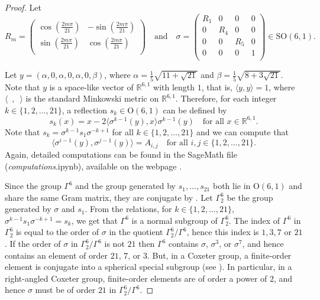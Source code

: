 \documentclass{amsart}
\theoremstyle{plain}
\theoremstyle{definition}
\theoremstyle{remark}
\numberwithin{equation}{section}
\newcommand{\rr}{\mathbb R}
\begin{document}
\begin{proof}

Let $$ R_m = \left(\begin{array}{rr}
\cos\left(\frac{2m\pi}{21}\right) & -\sin\left(\frac{2m\pi}{21}\right) \\
\sin\left(\frac{2m\pi}{21}\right) & \cos\left(\frac{2m\pi}{21}\right) \\
\end{array}\right)
\quad \textrm{and} \quad
\sigma = \left( \begin{array}{rrrr} 
R_1 & 0 & 0 & 0\\
0 & R_4 & 0 & 0 \\
0 & 0 & R_5 & 0\\
0 & 0 & 0 & 1 \\
\end{array} \right) \in \mathrm{SO}(6,1).$$

Let $y = \left( \alpha, 0 , \alpha, 0, \alpha, 0, \beta  \right)$, where $\alpha = \tfrac{1}{5}\sqrt{11 + \sqrt{21}}$ and $\beta = \tfrac{1}{5}\sqrt{8 + 3\sqrt{21}}$. Note that $y$ is a space-like vector of $\mathbb{R}^{6,1}$ with length $1$, that is,  $\langle y , y \rangle = 1$, where $\langle \phantom{y}, \phantom{y}  \rangle$ is the standard Minkowski metric on $\rr^{6,1}$. Therefore, for each integer $k \in \{ 1, 2, \dotsc, 21 \}$, a reflection $s_k \in \mathrm{O}(6,1)$ can be defined by 
$$ s_k (x) = x - 2 \langle \sigma^{k-1}(y), x \rangle \sigma^{k-1}(y) \quad\textrm{for all } x \in \mathbb{R}^{6,1}.$$
Note that $s_k = \sigma^{k-1} s_1 \sigma^{-k+1}$ for all $k \in \{ 1, 2, \dotsc, 21 \}$ and we can compute that  $$\langle \sigma^{i-1}(y), \sigma^{j-1}(y) \rangle = A_{i,j} \quad\textrm{for all } i, j \in \{ 1, 2, \dotsc, 21 \}. $$
Again, detailed computations can be found in the SageMath file (\emph{computations}.ipynb), available on the webpage \cite{computations}.



Since the group $\Gamma^6$ and the group generated by $s_1, \ldots, s_{21}$ both lie in $\mathrm{O}(6,1)$ and share the same Gram matrix, they are conjugate by \cite[Theorem~2.1]{Vin85}. Let $\Gamma_2^6$ be the group generated by $\sigma$ and $s_1$. From the relations, for $k \in \{ 1, 2, \dotsc, 21 \}$, $\sigma^{k-1} s_1 \sigma^{-k+1} = s_k$, we get that $\Gamma^6$ is a normal subgroup of $\Gamma_2^6$. The index of $\Gamma^6$ in $\Gamma^6_2$ is equal to the order of $\sigma$ in the quotient $\Gamma_2^6/\Gamma^6$, hence this index is $1,3,7$ or $21$. If the order of $\sigma$ in $\Gamma_2^6/\Gamma^6$ is not $21$ then $\Gamma^6$ contains $\sigma$, $\sigma^3$, or $\sigma^7$, and hence contains an element of order $21$, $7$, or $3$. But, in a Coxeter group, a finite-order element is conjugate into a spherical special subgroup (see \cite[Theorem.~12.3.4.(i)]{DA08}). In particular, in a right-angled Coxeter group, finite-order elements are of order a power of $2$, and hence $\sigma$ must be of order $21$ in $\Gamma_2^6/\Gamma^6$.
\end{proof}
\end{document}
